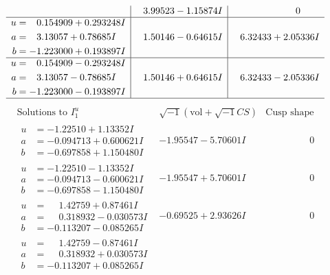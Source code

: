 \documentclass[1p]{elsarticle_modified}
\theoremstyle{definition}
\newcommand{\I}{\sqrt{-1}}
\begin{document}
$$\begin{array}{c|c|c}
 & \phantom{-}3.99523 - 1.15874 I & \phantom{-0.000000 } 0 \\ \hline\begin{aligned}
u &= \phantom{-}0.154909 + 0.293248 I \\
a &= \phantom{-}3.13057 + 0.78685 I \\
b &= -1.223000 + 0.193897 I\end{aligned}
 & \phantom{-}1.50146 - 0.64615 I & \phantom{-}6.32433 + 2.05336 I \\ \hline\begin{aligned}
u &= \phantom{-}0.154909 - 0.293248 I \\
a &= \phantom{-}3.13057 - 0.78685 I \\
b &= -1.223000 - 0.193897 I\end{aligned}
 & \phantom{-}1.50146 + 0.64615 I & \phantom{-}6.32433 - 2.05336 I\\
 \hline 
 \end{array}$$\newpage$$\begin{array}{c|c|c}  
\text{Solutions to }I^u_{1}& \I (\text{vol} + \sqrt{-1}CS) & \text{Cusp shape}\\
 \hline 
\begin{aligned}
u &= -1.22510 + 1.13352 I \\
a &= -0.094713 + 0.600621 I \\
b &= -0.697858 + 1.150480 I\end{aligned}
 & -1.95547 - 5.70601 I & \phantom{-0.000000 } 0 \\ \hline\begin{aligned}
u &= -1.22510 - 1.13352 I \\
a &= -0.094713 - 0.600621 I \\
b &= -0.697858 - 1.150480 I\end{aligned}
 & -1.95547 + 5.70601 I & \phantom{-0.000000 } 0 \\ \hline\begin{aligned}
u &= \phantom{-}1.42759 + 0.87461 I \\
a &= \phantom{-}0.318932 - 0.030573 I \\
b &= -0.113207 - 0.085265 I\end{aligned}
 & -0.69525 + 2.93626 I & \phantom{-0.000000 } 0 \\ \hline\begin{aligned}
u &= \phantom{-}1.42759 - 0.87461 I \\
a &= \phantom{-}0.318932 + 0.030573 I \\
b &= -0.113207 + 0.085265 I\end{aligned}

\end{array}$$
\end{document}
